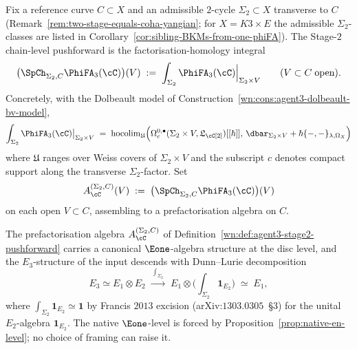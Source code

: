 \begin{definition}
\label{wn:def:agent3-stage2-pushforward}
Fix a reference curve $C\subset X$ and an admissible $2$-cycle $\Sigma_2\subset X$ transverse to $C$ (Remark~\ref{rem:two-stage-equals-coha-yangian}; for $X=K3\times E$ the admissible $\Sigma_2$-classes are listed in Corollary~\ref{cor:sibling-BKMs-from-one-phiFA}). The Stage-$2$ chain-level pushforward is the factorisation-homology integral
\[
 \bigl(\SpCh_{\Sigma_2,C}\PhiFA_3(\cC)\bigr)(V)
 \;:=\;
 \int_{\Sigma_2}\PhiFA_3(\cC)\Big|_{\Sigma_2\times V}
 \qquad
 (V\subset C\;\text{open}).
\]
Concretely, with the Dolbeault model of Construction~\ref{wn:cons:agent3-dolbeault-bv-model},
\[
 \int_{\Sigma_2}\PhiFA_3(\cC)\big|_{\Sigma_2\times V}
 \;=\;
 \mathrm{hocolim}_{\mathfrak U}
 \Bigl(
 \Omega^{0,\bullet}_c(\Sigma_2\times V,\mathfrak{L}_\cC[2])[[\hbar]],\,
 \dbar_{\Sigma_2\times V}
 +\hbar\{-,-\}_{\lambda,\Omega_X}
 \Bigr)
\]
where $\mathfrak U$ ranges over Weiss covers of $\Sigma_2\times V$ and the subscript $c$ denotes compact support along the transverse $\Sigma_2$-factor. Set
\[
 A^{(\Sigma_2,C)}_\cC(V)\;:=\;
 \bigl(\SpCh_{\Sigma_2,C}\PhiFA_3(\cC)\bigr)(V)
\]
on each open $V\subset C$, assembling to a prefactorisation algebra on $C$.
\end{definition}

\begin{proposition}
\label{wn:prop:agent3-native-e1-output}
\ClaimStatusProvedHere
The prefactorisation algebra $A^{(\Sigma_2,C)}_\cC$ of Definition~\ref{wn:def:agent3-stage2-pushforward} carries a canonical $\Eone$-algebra structure at the disc level, and the $E_3$-structure of the input descends with Dunn--Lurie decomposition
\[
 E_3\simeq E_1\otimes E_2
 \;\xrightarrow{\;\int_{\Sigma_2}\;}\;
 E_1\otimes\bigl(\textstyle\int_{\Sigma_2}\mathbf 1_{E_2}\bigr)
 \;\simeq\;
 E_1,
\]
where $\int_{\Sigma_2}\mathbf 1_{E_2}\simeq \mathbf 1$ by Francis $2013$ excision (arXiv:$1303.0305$~\S$3$) for the unital $E_2$-algebra $\mathbf 1_{E_2}$. The native $\Eone$-level is forced by Proposition~\ref{prop:native-en-level}; no choice of framing can raise it.
\end{proposition}

